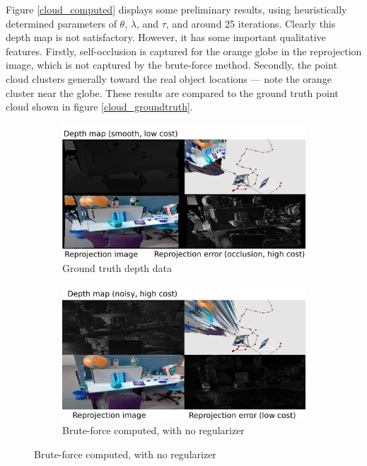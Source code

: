 \documentclass[conference]{IEEEtran}
\begin{document}
Figure \ref{cloud_computed} displays some preliminary results, using heuristically determined parameters of $\theta$, $\lambda$, and $\tau$, and around 25 iterations.
Clearly this depth map is not satisfactory. However, it has some important qualitative features. Firstly, self-occlusion is captured for the
orange globe in the reprojection image, which is not captured by the brute-force method. Secondly, the point cloud clusters generally
toward the real object locations --- note the orange cluster near the globe. These results are compared to the ground truth point cloud shown
in figure \ref{cloud_groundtruth}.


\begin{figure}[htbp]
\begin{subfigure}[b]{0.5\textwidth}
\centerline{\includegraphics[width=\textwidth]{figures/noisevis_groundtruth_text.png}}
\caption{Ground truth depth data}
\label{noisevis_groundtruth}
\end{subfigure}
\begin{subfigure}[b]{0.5\textwidth}
\centerline{\includegraphics[width=\textwidth]{figures/noisevis_computed_text.png}}
\caption{Brute-force computed, with no regularizer}
\label{noisevis_computed}
\end{subfigure}
\end{figure}
\end{document}
